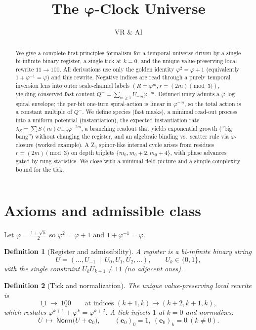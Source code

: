 \documentclass[11pt]{article}
\title{\vspace{-1em}\textbf{The $\boldsymbol{\varphi}$-Clock Universe}}
\author{VR \& AI}
\date{}
\newtheorem{definition}{Definition}
\theoremstyle{remark}
\begin{document}
\maketitle

\begin{abstract}
We give a complete first-principles formalism for a temporal universe driven by a single bi-infinite binary register, a single tick at $k{=}0$, and the unique value-preserving local rewrite $11\!\to\!100$.
All derivations use only the golden identity $\varphi^2=\varphi+1$ (equivalently $1+\varphi^{-1}=\varphi$) and this rewrite.
Negative indices are read through a purely temporal inversion lens into outer scale-channel labels $(R{=}\varphi^m,r{=}(2m)\!\!\pmod3)$, yielding conserved fast content $Q^-=\sum_{m\ge1}U_{-m}\varphi^{-m}$.
Detuned unity admits a $\varphi$-log spiral envelope; the per-bit one-turn spiral-action is linear in $\varphi^{-m}$, so the total action is a constant multiple of $Q^-$.
We define species (fast masks), a minimal read-out process into a uniform potential (instantiation), the expected instantiation rate $\lambda_S=\sum S(m)U_{-m}\varphi^{-2m}$, a branching readout that yields exponential growth (``big bang'') without changing the register, and an algebraic binding vs.\ scatter rule via $\varphi$-closure (worked example).
A Z$_3$ spinor-like internal cycle arises from residues $r=(2m)\!\!\pmod3$ on depth triplets $\{m_0,m_0{+}2,m_0{+}4\}$, with phase advances gated by rung statistics.
We close with a minimal field picture and a simple complexity bound for the tick.
\end{abstract}

\section{Axioms and admissible class}\label{sec:axioms}
Let $\varphi=\frac{1+\sqrt5}{2}$ so $\varphi^2=\varphi+1$ and $1+\varphi^{-1}=\varphi$.

\begin{definition}[Register and admissibility]
A register is a bi-infinite binary string
\[
U=(\ldots,U_{-1}\ \mid\ U_0,U_1,U_2,\ldots),\qquad U_k\in\{0,1\},
\]
with the single constraint $U_kU_{k+1}\neq 11$ (\emph{no adjacent ones}).
\end{definition}

\begin{definition}[Tick and normalization]\label{def:tick}
The unique value-preserving local rewrite is
\begin{equation}\label{rw}
\underline{11}\ \longrightarrow\ \underline{100}\qquad\text{at indices }(k{+}1,k)\mapsto(k{+}2,k{+}1,k),
\end{equation}
which restates $\varphi^{k+1}{+}\varphi^k=\varphi^{k+2}$.
A tick injects $1$ at $k=0$ and normalizes:
\begin{equation}\label{tick}
U\ \mapsto\ \mathsf{Norm}\big(U+\mathbf e_0\big),\qquad (\mathbf e_0)_0=1, \ (\mathbf e_0)_k=0\ (k\neq0).
\end{equation}
\end{definition}
\end{document}
